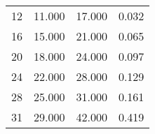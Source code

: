 % 
\begin{tabular}{cccc}
  \hline
  \hline
12 & 11.000 & 17.000 & 0.032 \\ 
  16 & 15.000 & 21.000 & 0.065 \\ 
  20 & 18.000 & 24.000 & 0.097 \\ 
  24 & 22.000 & 28.000 & 0.129 \\ 
  28 & 25.000 & 31.000 & 0.161 \\ 
  31 & 29.000 & 42.000 & 0.419 \\ 
   \hline
\end{tabular}
